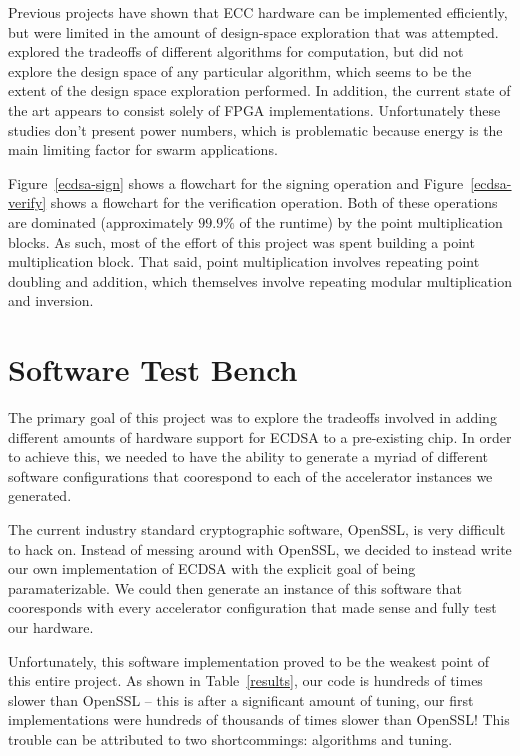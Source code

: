 \documentclass[twocolumn]{article}
\begin{document}
Previous projects\cite{nnll-ecdsa_hw} have shown that ECC hardware can
be implemented efficiently, but were limited in the amount of
design-space exploration that was attempted.  \cite{mmm-hw_ecc}
explored the tradeoffs of different algorithms for computation, but
did not explore the design space of any particular algorithm, which
seems to be the extent of the design space exploration performed.  In
addition, the current state of the art appears to consist solely of
FPGA implementations.  Unfortunately these studies don't present power
numbers, which is problematic because energy is the main limiting
factor for swarm applications.

Figure~\ref{ecdsa-sign} shows a flowchart for the signing operation
and Figure~\ref{ecdsa-verify} shows a flowchart for the verification
operation.  Both of these operations are dominated (approximately
$99.9\%$ of the runtime) by the point multiplication blocks.  As such,
most of the effort of this project was spent building a point
multiplication block.  That said, point multiplication involves
repeating point doubling and addition, which themselves involve
repeating modular multiplication and inversion.

\section{Software Test Bench}

The primary goal of this project was to explore the tradeoffs involved
in adding different amounts of hardware support for ECDSA to a
pre-existing chip.  In order to achieve this, we needed to have the
ability to generate a myriad of different software configurations that
coorespond to each of the accelerator instances we generated.

The current industry standard cryptographic software, OpenSSL, is very
difficult to hack on.  Instead of messing around with OpenSSL, we
decided to instead write our own implementation of ECDSA with the
explicit goal of being paramaterizable.  We could then generate an
instance of this software that cooresponds with every accelerator
configuration that made sense and fully test our hardware.

Unfortunately, this software implementation proved to be the weakest
point of this entire project.  As shown in Table~\ref{results}, our
code is hundreds of times slower than OpenSSL -- this is after a
significant amount of tuning, our first implementations were hundreds
of thousands of times slower than OpenSSL!  This trouble can be
attributed to two shortcommings: algorithms and tuning.
\end{document}
